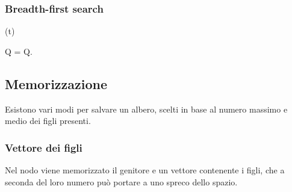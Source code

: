 \subsubsection{Breadth-first search}
\begin{algorithm}[H]
\DontPrintSemicolon
{}

\caption{\protect\Bfs(\protect\Tree t)}

\Queue Q = \QueueCos{}\;
Q.\;
\end{algorithm}
\subsection{Memorizzazione}
Esistono vari modi per salvare un albero, scelti in base al numero massimo e medio dei figli presenti.
\subsubsection{Vettore dei figli}
Nel nodo viene memorizzato il genitore e un vettore contenente i figli, che a seconda del loro numero pu\`o portare a uno spreco dello spazio.
\newpage
